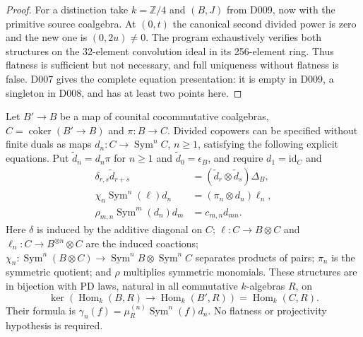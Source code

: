 \begin{proof}
For a distinction take $k=\mathbb Z/4$ and $(B,J)$ from D009,
now with the primitive source coalgebra. At $(0,t)$ the canonical
second divided power is zero and the new one is $(0,2u)\ne0$.
The program exhaustively verifies both structures on the
32-element convolution ideal in its 256-element ring.
Thus flatness is sufficient but not necessary, and full uniqueness
without flatness is false. D007 gives the complete equation
presentation: it is empty in D009, a singleton in D008, and has
at least two points here.
\end{proof}

\begin{theorem}
\label{sa08:D012}
Let $B'\to B$ be a map of counital cocommutative coalgebras,
$C=\operatorname{coker}(B'\to B)$ and $\pi:B\to C$.
Divided copowers can be specified without finite duals as maps
$d_n:C\to\operatorname{Sym}^nC$, $n\geq1$, satisfying the
following explicit equations. Put $\widetilde d_n=d_n\pi$
for $n\geq1$ and $\widetilde d_0=\epsilon_B$, and require
$d_1=\mathrm{id}_C$ and
\begin{align}
 \delta_{r,s}\widetilde d_{r+s}
  &=(\widetilde d_r\otimes\widetilde d_s)\Delta_B,
       \tag{DA}\label{eq:D-DA}\\
 \chi_n\operatorname{Sym}^n(\ell)d_n
  &=(\pi_n\otimes d_n)\ell_n,
       \tag{DS}\label{eq:D-DS}\\
 \rho_{m,n}\operatorname{Sym}^m(d_n)d_m
  &=c_{m,n}d_{mn}.\tag{DI}\label{eq:D-DI}
\end{align}
Here $\delta$ is induced by the additive diagonal on $C$;
$\ell:C\to B\otimes C$ and $\ell_n:C\to B^{\otimes n}\otimes C$
are the induced coactions;
$\chi_n:\operatorname{Sym}^n(B\otimes C)\to
\operatorname{Sym}^nB\otimes\operatorname{Sym}^nC$ separates
products of pairs; $\pi_n$ is the symmetric quotient; and $\rho$
multiplies symmetric monomials.
These structures are in bijection with PD laws, natural in all
commutative $k$-algebras $R$, on
\[
 \ker(\operatorname{Hom}_k(B,R)\to\operatorname{Hom}_k(B',R))
 =\operatorname{Hom}_k(C,R).
\]
Their formula is
$\gamma_n(f)=\mu_R^{(n)}\operatorname{Sym}^n(f)d_n$.
No flatness or projectivity hypothesis is required.
\end{theorem}
